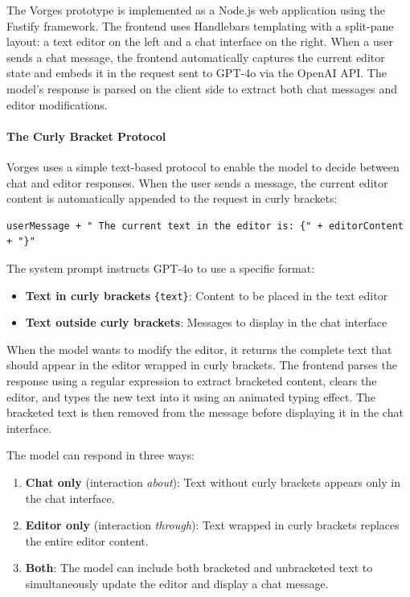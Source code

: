 The Vorges prototype is implemented as a Node.js web application using the Fastify framework. The frontend uses Handlebars templating with a split-pane layout: a text editor on the left and a chat interface on the right. When a user sends a chat message, the frontend automatically captures the current editor state and embeds it in the request sent to GPT-4o via the OpenAI API. The model's response is parsed on the client side to extract both chat messages and editor modifications.

\paragraph{The Curly Bracket Protocol}

Vorges uses a simple text-based protocol to enable the model to decide between chat and editor responses. When the user sends a message, the current editor content is automatically appended to the request in curly brackets:

\begin{verbatim}
userMessage + " The current text in the editor is: {" + editorContent + "}"
\end{verbatim}

The system prompt instructs GPT-4o to use a specific format:
\begin{itemize}
    \item \textbf{Text in curly brackets} \texttt{\{text\}}: Content to be placed in the text editor
    \item \textbf{Text outside curly brackets}: Messages to display in the chat interface
\end{itemize}

When the model wants to modify the editor, it returns the complete text that should appear in the editor wrapped in curly brackets. The frontend parses the response using a regular expression to extract bracketed content, clears the editor, and types the new text into it using an animated typing effect. The bracketed text is then removed from the message before displaying it in the chat interface.

The model can respond in three ways:
\begin{enumerate}
    \item \textbf{Chat only} (interaction \textit{about}): Text without curly brackets appears only in the chat interface.
    \item \textbf{Editor only} (interaction \textit{through}): Text wrapped in curly brackets replaces the entire editor content.
    \item \textbf{Both}: The model can include both bracketed and unbracketed text to simultaneously update the editor and display a chat message.
\end{enumerate}

